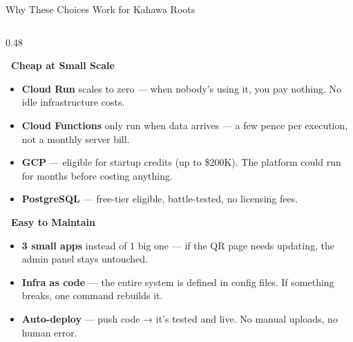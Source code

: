 \documentclass[aspectratio=169]{beamer}
\begin{document}
\begin{frame}{Why These Choices Work for Kahawa Roots}
\scriptsize
\begin{columns}[T]

\begin{column}{0.48\textwidth}

\textbf{\faPoundSign\ Cheap at Small Scale}
\vspace{0.1em}

\begin{itemize}\setlength{\itemsep}{3pt}
    \item \textbf{\textcolor{kahawaBrown}{Cloud Run}} scales to zero — when nobody's using it, you pay nothing. No idle infrastructure costs.

    \item \textbf{\textcolor{kahawaBrown}{Cloud Functions}} only run when data arrives — a few pence per execution, not a monthly server bill.

    \item \textbf{\textcolor{kahawaBrown}{GCP}} — eligible for startup credits (up to \$200K). The platform could run for months before costing anything.

    \item \textbf{\textcolor{kahawaBrown}{PostgreSQL}} — free-tier eligible, battle-tested, no licensing fees.
\end{itemize}

\vspace{0.1em}
\textbf{\faTools\ Easy to Maintain}
\vspace{0.1em}

\begin{itemize}\setlength{\itemsep}{3pt}
    \item \textbf{\textcolor{kahawaBrown}{3 small apps}} instead of 1 big one — if the QR page needs updating, the admin panel stays untouched.

    \item \textbf{\textcolor{kahawaBrown}{Infra as code}} — the entire system is defined in config files. If something breaks, one command rebuilds it.

    \item \textbf{\textcolor{kahawaBrown}{Auto-deploy}} — push code → it's tested and live. No manual uploads, no human error.
\end{itemize}


\end{column}
\end{columns}
\end{frame}
\end{document}
